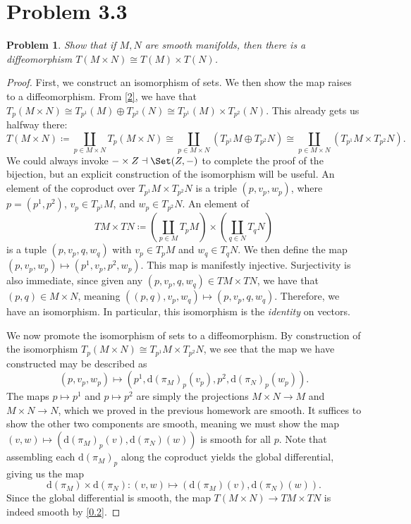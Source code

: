 \documentclass[11pt, letterpaper]{article}
\theoremstyle{plain}
\newtheorem{problem}{Problem}
\begin{document}
\section{Problem 3.3}
\begin{problem}
	Show that if $M,N$ are smooth manifolds, then there is a diffeomorphism $T(M\times N)\cong T(M)\times T(N)$.
\end{problem}
\begin{proof}
	First, we construct an isomorphism of sets. We then show the map raises to a diffeomorphism. From \cref{2}, we have that $T_p(M\times N)\cong T_{p^1} (M)\oplus T_{p^2} (N)\cong T_{p^1} (M)\times T_{p^2} (N)$. This already gets us halfway there:
	\[
		T(M\times N)\coloneqq \coprod_{p\in M\times N} T_p(M\times N) \cong \coprod_{p\in M\times N} (T_{p^1} M\oplus T_{p^2} N)\cong \coprod_{p\in M\times N} (T_{p^1} M\times T_{p^2} N)
	.\]
	We could always invoke $-\times Z \dashv \Set (Z,-)$ to complete the proof of the bijection, but an explicit construction of the isomorphism will be useful. An element of the coproduct over $T_{p^1} M\times T_{p^2} N$ is a triple $(p,v_p,w_p)$, where $p=(p^1,p^2)$, $v_p\in T_{p^1} M$, and $w_p\in T_{p^2} N$. An element of
	\[
		TM \times TN \coloneqq \left( \coprod_{p\in M} T_pM \right) \times \left( \coprod_{q\in N} T_qN \right) 
	\]
	is a tuple $(p,v_p,q,w_q)$ with $v_p\in T_pM$ and $w_q\in T_qN$. We then define the map $(p,v_p,w_p)\mapsto (p^1,v_{p},p^2,w_p)$. This map is manifestly injective. Surjectivity is also immediate, since given any $(p,v_p,q,w_q)\in TM\times TN$, we have that $(p,q)\in M\times N$, meaning $((p,q),v_p,w_q) \mapsto (p,v_p,q,w_q)$. Therefore, we have an isomorphism. In particular, this isomorphism is the \emph{identity} on vectors.

	We now promote the isomorphism of sets to a diffeomorphism. By construction of the isomorphism $T_p(M\times N)\cong T_{p^1} M\times T_{p^2} N$, we see that the map we have constructed may be described as
	\[
		(p,v_p,w_p)\mapsto (p^1,\mathrm{d} (\pi_M)_p(v_p),p^2,\mathrm{d} (\pi _N)_p(w_p))
	.\]
	The maps $p\mapsto p^1$ and $p\mapsto p^2$ are simply the projections $M\times N\to M$ and $M\times N\to N$, which we proved in the previous homework are smooth. It suffices to show the other two components are smooth, meaning we must show the map $(v,w)\mapsto (\mathrm{d} (\pi _M)_p(v),\mathrm{d}(\pi _N)(w))$ is smooth for all $p$. Note that assembling each $\mathrm{d} (\pi _M)_p$ along the coproduct yields the global differential, giving us the map
	\[
		\mathrm{d} (\pi _M)\times \mathrm{d} (\pi _N) : (v,w)\mapsto (\mathrm{d} (\pi _M)(v),\mathrm{d} (\pi _N)(w))
	.\]
	Since the global differential is smooth, the map $T(M\times N)\to TM\times TN$ is indeed smooth by \cref{0.2}.


\end{proof}
\end{document}
